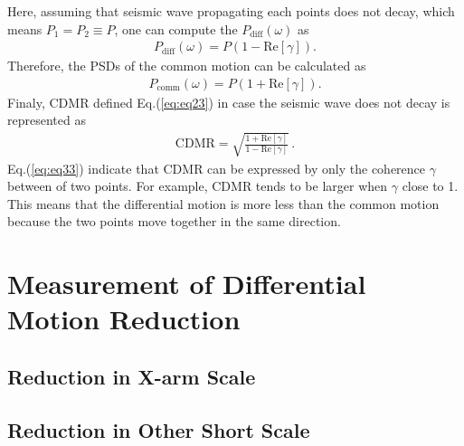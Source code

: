 Here, assuming that seismic wave propagating each points does not decay, which means $P_{1}=P_{2} \equiv P$, one can compute the $P_{\mathrm{diff}}(\omega)$ as 
\begin{eqnarray}
  P_{\mathrm{diff}}(\omega) = P (1-\mathrm{Re}\left[\gamma\right]).
\end{eqnarray}
Therefore, the PSDs of the common motion can be calculated as
\begin{eqnarray}
  P_{\mathrm{comm}}(\omega) = P (1+\mathrm{Re}\left[\gamma\right]).
\end{eqnarray}
Finaly, CDMR defined Eq.(\ref{eq:eq23}) in case the seismic wave does not decay is represented as
\begin{eqnarray}
 \mathrm{CDMR} = \sqrt{\frac{1 + \mathrm{Re} \left[\gamma \right] }{1 - \mathrm{Re} \left[\gamma \right]}}\,. \label{eq:eq33}
\end{eqnarray}
Eq.(\ref{eq:eq33}) indicate that CDMR can be expressed by only the coherence $\gamma$ between of two points. For example, CDMR tends to be larger when $\gamma$ close to 1. This means that the differential motion is more less than the common motion because the two points move together in the same direction.

\section{Measurement of Differential Motion Reduction}
\subsection{Reduction in X-arm Scale}
\subsection{Reduction in Other Short Scale}





